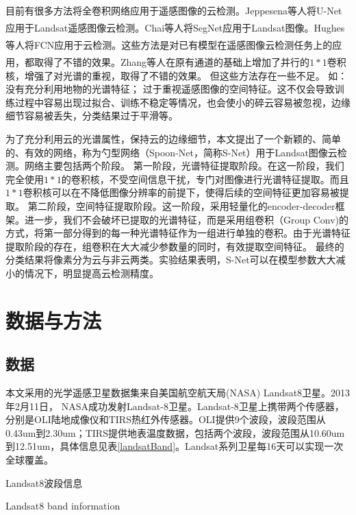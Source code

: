 \documentclass[10pt,UTF8,fntef]{ctexart}
\newcommand{\upcite}[1]{\textsuperscript{\textsuperscript{\cite{#1}}}}
\begin{document}
\begin{multicols}{2}
目前有很多方法将全卷积网络应用于遥感图像的云检测。Jeppesena等人\upcite{jeppesen2019cloud}将U-Net应用于Landsat遥感图像云检测。Chai等人\upcite{chai2019cloud}将SegNet应用于Landsat图像。Hughes等人\upcite{hughes2019high}将FCN应用于云检测。这些方法是对已有模型在遥感图像云检测任务上的应用，都取得了不错的效果。Zhang等人\upcite{zhang2019convective}在原有通道的基础上增加了并行的$1*1$卷积核，增强了对光谱的重视，取得了不错的效果。
但这些方法存在一些不足。
如：没有充分利用地物的光谱特征；
过于重视遥感图像的空间特征。这不仅会导致训练过程中容易出现过拟合、训练不稳定等情况，也会使小的碎云容易被忽视，边缘细节容易被丢失，分类结果过于平滑等。

为了充分利用云的光谱属性，保持云的边缘细节，本文提出了一个新颖的、简单的、有效的网络，称为勺型网络（Spoon-Net，简称S-Net）用于Landsat图像云检测。网络主要包括两个阶段。
第一阶段，光谱特征提取阶段。在这一阶段，我们完全使用$1*1$的卷积核，不受空间信息干扰，专门对图像进行光谱特征提取。而且$1*1$卷积核可以在不降低图像分辨率的前提下，使得后续的空间特征更加容易被提取。
第二阶段，空间特征提取阶段。这一阶段，采用轻量化的encoder-decoder框架。进一步，我们不会破坏已提取的光谱特征，而是采用组卷积（Group Conv)的方式，将第一部分得到的每一种光谱特征作为一组进行单独的卷积。由于光谱特征提取阶段的存在，组卷积在大大减少参数量的同时，有效提取空间特征。
最终的分类结果将像素分为云与非云两类。实验结果表明，S-Net可以在模型参数大大减小的情况下，明显提高云检测精度。

\section[]{数据与方法}
\subsection{数据}
本文采用的光学遥感卫星数据集来自美国航空航天局(NASA) Landsat8卫星。2013年2月11日， NASA成功发射Landsat-8卫星。Landsat-8卫星上携带两个传感器，分别是OLI陆地成像仪和TIRS热红外传感器。OLI提供9个波段，波段范围从0.43um到2.30um；TIRS提供地表温度数据，包括两个波段，波段范围从10.60um到12.51um，具体信息见表\ref{landsatBand}。Landsat系列卫星每16天可以实现一次全球覆盖。

\begin{table}[H]
    \caption{Landsat8波段信息}
    \addtocounter{table}{-1}
    \vspace{-5pt}
    \renewcommand{\tablename}{Tab}
    \caption{Landsat8 band information}
    \renewcommand{\tablename}{表}
    \vspace{5pt}


\end{table}
\end{multicols}
\end{document}
